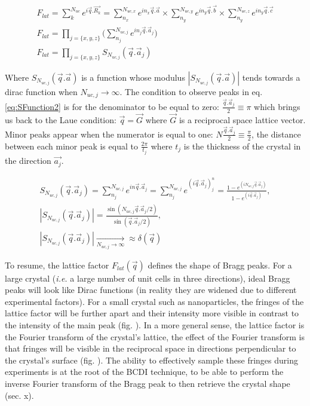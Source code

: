 \begin{gather}
    \label{eq:LatFactor}
    F_{lat} = \sum_k^{N_{uc}} e^{i\vec{q}.\vec{R_k}} = \sum_{n_x}^{N_{uc, x}} e^{i n_x\vec{q}.\vec{a}} \times \sum_{n_y}^{N_{uc, y}} e^{i n_y\vec{q}.\vec{b}} \times \sum_{n_y}^{N_{uc, z}} e^{i n_y\vec{q}.\vec{c}}\\
    F_{lat} = \prod_{j=\{x,y,z\}} \Bigg( \sum_{n_j}^{N_{uc, j}} e^{i n_j\vec{q}.\vec{a}_j} \Bigg)\\
    F_{lat} = \prod_{j=\{x,y,z\}} S_{N_{uc, j}}(\vec{q}.\vec{a}_j)
\end{gather}

Where $S_{N_{uc, j}}(\vec{q}.\vec{a})$ is a function whose modulus $|S_{N_{uc, j}}(\vec{q}.\vec{a})|$ tends towards a dirac function when $N_{uc, j} \longrightarrow \infty$.
The condition to observe peaks in eq. \ref{eq:SFunction2} is for the denominator to be equal to zero: $\frac{\vec{q}.\vec{a}_j}{2} \equiv \pi$ which brings us back to the Laue condition: $\vec{q} = \vec{G}$ where $\vec{G}$ is a reciprocal space lattice vector.
Minor peaks appear when the numerator is equal to one: $N\frac{\vec{q}.\vec{a}_j}{2} \equiv \frac{\pi}{2}$, the distance between each minor peak is equal to $\frac{2\pi}{t_j}$ where $t_j$ is the thickness of the crystal in the direction $\vec{a_j}$.

\begin{gather}
    \label{eq:SFunction1}
    S_{N_{uc, j}}(\vec{q}.\vec{a}_j) = \sum_{n_j}^{N_{uc, j}} e^{in\vec{q}.\vec{a}_j} = \sum_{n_j}^{N_{uc, j}} e^{(i\vec{q}.\vec{a}_j)^n_j} = \frac{1-e^{(i N_{uc, j} \vec{q}.\vec{a}_j)}}{1-e^{(i\vec{q}.\vec{a}_j)}},\\
    \label{eq:SFunction2}
    |S_{N_{uc, j}}(\vec{q}.\vec{a}_j)| = \frac{\sin(N_{uc, j} \vec{q}.\vec{a}_j/2)}{\sin(\vec{q}.\vec{a}_j/2)},\\
    \label{eq:SFunction3}
    |S_{N_{uc, j}}(\vec{q}.\vec{a}_j)| \underset{N_{uc, j} \to \infty}{\longrightarrow} \approx \delta (\vec{q})
\end{gather}

To resume, the lattice factor $F_{lat}(\vec{q})$ defines the shape of Bragg peaks.
For a large crystal (\textit{i.e.} a large number of unit cells in three directions), ideal Bragg peaks will look like Dirac functions (in reality they are widened due to different experimental factors).
For a small crystal such as nanoparticles, the fringes of the lattice factor will be further apart and their intensity more visible in contrast to the intensity of the main peak (fig. ).
In a more general sense, the lattice factor is the Fourier transform of the crystal's lattice, the effect of the Fourier transform is that fringes will be visible in the reciprocal space in directions perpendicular to the crystal's surface (fig. ).
The ability to effectively sample these fringes during experiments is at the root of the BCDI technique, to be able to perform the inverse Fourier transform of the Bragg peak to then retrieve the crystal shape (sec. x).


